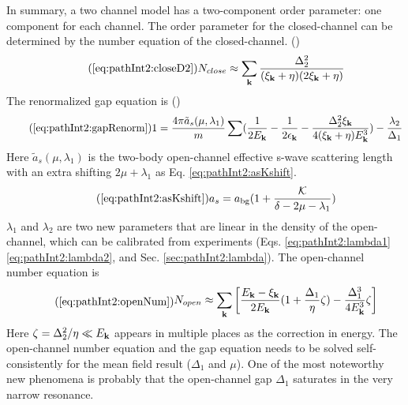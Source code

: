        In  summary, a two channel model has a two-component order parameter: one component for each channel.  The order parameter for the closed-channel can be determined by the number equation of the closed-channel. ()
\begin{equation}\tag{\ref{eq:pathInt2:closeD2}}
N_{close}\approx\sum_{\vk}\frac{\Delta_{2}^2}{(\xi_{\vk}+\eta)(2\xi_{\vk}+\eta)}
\end{equation}
 The renormalized gap equation is ()
 \begin{equation}\tag{\ref{eq:pathInt2:gapRenorm}}
1=\frac{4\pi{\tilde{a}_{s}(\mu,\lambda_{1})}}{m}\sum(\nth{2E_{\vk}}-\nth{2\epsilon_{\vk}}-\frac{\Delta_{2}^{2}\xi_{\vk}}{4(\xi_{\vk}+\eta){E_{\vk}^{3}}})
	-\frac{\lambda_{2}}{\Delta_{1}}
\end{equation}
Here $\tilde{a}_{s}(\mu,\lambda_{1})$ is the two-body open-channel effective  s-wave scattering length with  an extra shifting $2\mu+\lambda_{1}$ as Eq. \ref{eq:pathInt2:asKshift}. 
\begin{equation}\tag{\ref{eq:pathInt2:asKshift}}
{a}_{s}=a_{\text{bg}}(1+\frac{\mathcal{K}}{\delta-2\mu-\lambda_{1}})
\end{equation}
  $\lambda_{1}$ and $\lambda_{2}$ are two new parameters that are  linear in the density of the open-channel, which can be calibrated from  experiments (Eqs. \ref{eq:pathInt2:lambda1} \ref{eq:pathInt2:lambda2}, and Sec. \ref{sec:pathInt2:lambda}).  The open-channel number equation is 
\begin{equation}\tag{\ref{eq:pathInt2:openNum}}
\begin{split}
N_{open}\approx\sum_\vk\mbr{\frac{E_\vk-\xi_\vk}{2E_\vk}(1+\frac{\Delta_{1}}{\eta}\zeta)-\frac{\Delta_{1}^{3}}{4E_\vk^{3}}\zeta
	}	
\end{split}
\end{equation}
Here $\zeta=\Delta_{2}^{2}/\eta\ll{}E_{\mathbf{k}}$ appears in multiple places as the correction in energy.  The open-channel number equation and the gap equation needs to be solved self-consistently for the mean field result ($\Delta_{1}$ and $\mu$).  One of the most noteworthy new phenomena is probably that the open-channel gap $\Delta_{1}$ saturates in the very narrow resonance. 

